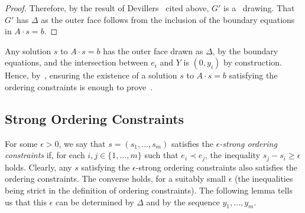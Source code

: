 \begin{proof}
		
		
	Therefore, by the result of Devillers \etal\ cited above, $G'$
	is a \Fary\ drawing. That $G'$ has $\Delta$ as the outer
	face follows from the inclusion of the boundary equations in
	$A\cdot s = b$.
\end{proof}

Any solution $s$ to $A\cdot s=b$ has the outer face drawn as $\Delta$,
by the boundary equations, and the intersection between $e_i$ and $Y$ is $(0,y_i)$ by construction. Hence, by~, ensuring the existence of a solution $s$ to $A\cdot s=b$ satisfying the ordering constraints is enough to prove~.

\subsection{Strong Ordering Constraints}
\label{strong}

For some $\epsilon > 0$, we say that $s=(s_1,\ldots,s_m)$ satisfies
the \emph{$\epsilon$-strong ordering constraints} if, for each
$i,j\in\{1,\ldots,m\}$ such that $e_i\prec e_j$, the inequality
$s_j-s_i \ge \epsilon$ holds.
Clearly, any $s$ satisfying the $\epsilon$-strong ordering constraints
also satisfies the ordering constraints. 
The converse holds, for a suitably small $\epsilon$ (the inequalities
being strict in the definition of ordering constraints). The following
lemma tells us that this $\epsilon$ can be determined by $\Delta$ and by the
sequence $y_1,\ldots,y_m$.
%

